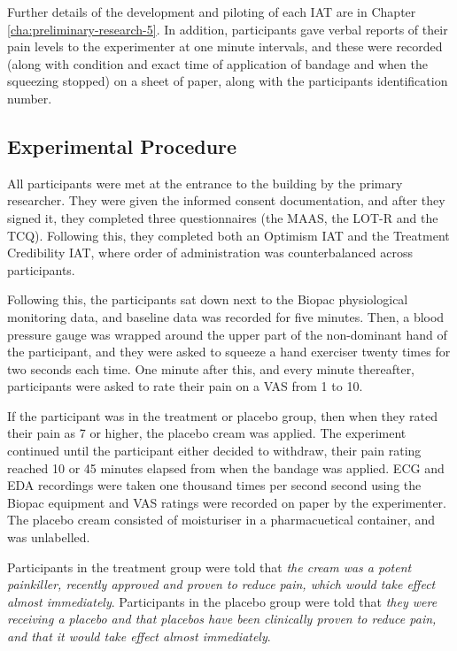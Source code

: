 Further details of the development and piloting of each IAT are in Chapter \ref{cha:preliminary-research-5}. 
In addition, participants gave verbal reports of their pain levels to the experimenter at one minute intervals, and these were recorded (along with condition and exact time of application of bandage and when the squeezing stopped) on a sheet of paper, along with the participants identification number. 


\subsection{Experimental Procedure}

All participants were met at the entrance to the building by the primary researcher. They were given the informed consent documentation, and after they signed it, they completed three questionnaires (the MAAS, the LOT-R and the TCQ). Following this, they completed both an Optimism IAT and the Treatment Credibility IAT, where order of administration was counterbalanced across participants.

Following this, the participants sat down next to the Biopac physiological monitoring data, and baseline data was recorded for five minutes.  Then, a blood pressure gauge was wrapped around the upper part of the non-dominant hand of the participant, and they were asked to squeeze a hand exerciser twenty times for two seconds each time. One minute after this, and every minute thereafter, participants were asked to rate their pain on a VAS from 1 to 10.

If the participant was in the treatment or placebo group, then when they rated their pain as 7 or higher, the placebo cream was applied. The experiment continued until the participant either decided to withdraw, their pain rating reached 10 or 45 minutes elapsed  from when the bandage was applied. ECG and EDA recordings were taken one thousand times per second second using the Biopac equipment and VAS ratings were recorded on paper by the experimenter. The placebo cream consisted of moisturiser in a pharmacuetical container, and was unlabelled.

Participants in the treatment group were told that \textit{the cream was a potent painkiller, recently approved and proven to reduce pain, which would take effect almost immediately}. Participants in the placebo group were told that \textit{they were receiving a placebo and that placebos have been clinically proven to reduce pain, and that it would take effect almost immediately}.

